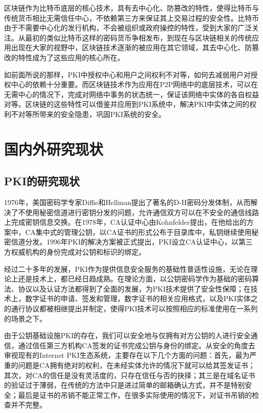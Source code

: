区块链作为比特币底层的核心技术，具有去中心化、防篡改的特性，使得比特币与传统货币相比无需信任中心，不依赖第三方来保证其上交易过程的安全性。比特币由于不需要中心化的发行机构，不会被组织或政府操控的特性，受到大家的广泛关注。从最初的类似比特币这样的密码货币争相发布，到现在与区块链相关的传统应用出现在大家的视野中，区块链技术逐渐的被应用在其它领域，其去中心化、防篡改的特性成为了这些应用的核心所在。

如前面所说的那样，PKI中授权中心和用户之间权利不对等，如何去减弱用户对授权中心的依赖十分重要。而区块链技术作为应用在P2P网络中的底层技术，可以在无需中心的情况下，完成对网络中事务的状态统一，保证该网络中实体的各自权益对等。区块链的这些特性可以借鉴并应用到PKI系统中，解决PKI中实体之间的权利不对等所带来的安全隐患，巩固PKI系统的安全。


\section{国内外研究现状}

\subsection{PKI的研究现状}

1976年，美国密码学专家Diffie和Hellman提出了著名的D-H密码分发体制，从而解决了不使用秘密信道进行密钥分发的问题，允许通信双方可以在不安全的通信线路上完成密钥信息交换。在1978年，CA认证中心由Kohnfelder提出，在他给出的方案中，CA集中式的管理公钥，以CA证书的形式公布于目录库中，私钥继续使用秘密信道分发。1996年PKI的解决方案被正式提出，PKI设立CA认证中心，以第三方权威机构的身份完成对公钥和标识的绑定。

经过二十多年的发展，PKI作为提供信息安全服务的基础性普适性设施，无论在理论上还是技术上，都已经日趋成熟。在理论方面，以公钥密码学作为基础的密码算法、协议以及认证方法都得到了全面的发展，为PKI技术提供了安全性保障；在技术上，数字证书的申请、签发和管理，数字证书的相关应用格式，以及PKI实体之的通行协议都被相继提出并制定，使得PKI技术可以按照相应的标准使用在一系列的场景之下。


由于公钥基础设施PKI的存在，我们可以安全地与仅拥有对方公钥的人进行安全通信，通过信任第三方机构CA签发的证书完成公钥与身份的绑定。从安全的角度去审视现有的Internet PKI生态系统，主要存在以下几个方面的问题：首先，最为严重的问题是CA拥有绝对的权利，在未经实体允许的情况下就可以给其签发证书；其次，对CA的信任是没有灵活度的，只存在信任与否的抉择；其三是在域名证书的验证过于薄弱，在传统的方法中只是进过简单的邮箱确认方式，并不是特别安全；最后是证书的吊销不能正常工作，在很多实际使用的情况下，对证书吊销的检查并不完整\supercite{ristic2014bulletproof}。

